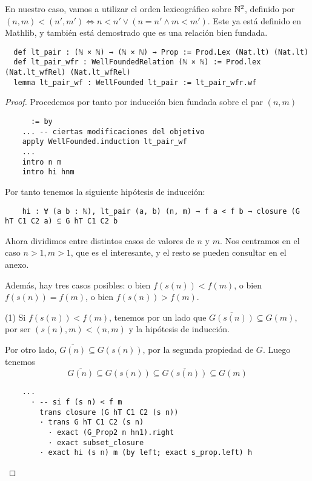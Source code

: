En nuestro caso, vamos a utilizar el orden lexicográfico sobre $\mathbb{N}^2$, definido por $(n, m) < (n', m') \iff n<n' \lor (n=n' \land m<m')$. Este ya está definido en Mathlib, y también está demostrado que es una relación bien fundada.

\begin{lstlisting}
  def lt_pair : (ℕ × ℕ) → (ℕ × ℕ) → Prop := Prod.Lex (Nat.lt) (Nat.lt)
  def lt_pair_wfr : WellFoundedRelation (ℕ × ℕ) := Prod.lex (Nat.lt_wfRel) (Nat.lt_wfRel)
  lemma lt_pair_wf : WellFounded lt_pair := lt_pair_wfr.wf
\end{lstlisting}

\begin{proof}
  Procedemos por tanto por inducción bien fundada sobre el par $(n, m)$

  \begin{lstlisting}
      := by
    ... -- ciertas modificaciones del objetivo
    apply WellFounded.induction lt_pair_wf
    ...
    intro n m
    intro hi hnm \end{lstlisting}

  Por tanto tenemos la siguiente hipótesis de inducción:

  \begin{lstlisting}
    hi : ∀ (a b : ℕ), lt_pair (a, b) (n, m) → f a < f b → closure (G hT C1 C2 a) ⊆ G hT C1 C2 b \end{lstlisting}

  Ahora dividimos entre distintos casos de valores de $n$ y $m$. Nos centramos en el caso $n >1, m>1$, que es el interesante, y el resto se pueden consultar en el anexo.

  Además, hay tres casos posibles: o bien $f(s(n)) < f(m)$, o bien $f(s(n)) = f(m)$, o bien $f(s(n)) > f(m)$.

  (1) Si $f(s(n)) < f(m)$, tenemos por un lado que $\overline{G(s(n))} \subseteq G(m)$, por ser $(s(n), m) < (n, m)$ y la hipótesis de inducción.

  Por otro lado, $\overline{G(n)} \subseteq G(s(n))$, por la segunda propiedad de $G$. Luego tenemos
  $$
  \overline{G(n)} \subseteq G(s(n)) \subseteq \overline{G(s(n))} \subseteq G(m)
  $$

  \begin{lstlisting}
    ...
      · -- si f (s n) < f m
        trans closure (G hT C1 C2 (s n))
        · trans G hT C1 C2 (s n)
          · exact (G_Prop2 n hn1).right
          · exact subset_closure
        · exact hi (s n) m (by left; exact s_prop.left) h \end{lstlisting}


\end{proof}
